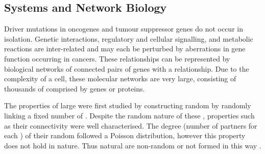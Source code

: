 \subsection{Systems and Network Biology}

Driver \glspl{mutation} in \glspl{oncogene} and \gls{tumour suppressor} genes do not occur in isolation. Genetic interactions, regulatory and cellular signalling, and metabolic reactions are inter-related and may each be perturbed by aberrations in gene function occurring in \glspl{cancer}. These relationships can be represented by biological networks of connected pairs of genes with a relationship. Due to the complexity of a cell, these molecular networks are very large, consisting of thousands of  comprised by genes or proteins. 

The properties of large  were first studied by constructing random  by randomly linking a fixed number of  \citep{Erdos1959, Erdos1960}. Despite the random nature of these , properties such as their connectivity were well characterised. The  degree (number of partners for each ) of their random  followed a Poisson distribution, however this property does not hold in nature. Thus natural  are non-random or not formed in this way \citep{Barabasi2004}. 

